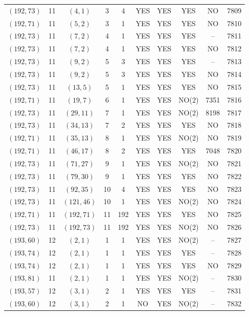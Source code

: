 \begin{longtable}{|c|c|c|c|c|c|c|c|c|c|}
$(192, 73)$ & 11 & $(4, 1)$ & 3 & 4 & YES & YES & YES & NO & 7809\\
$(192, 71)$ & 11 & $(5, 2)$ & 3 & 1 & YES & YES & YES & NO & 7810\\
$(192, 73)$ & 11 & $(7, 2)$ & 4 & 1 & YES & YES & YES & -- & 7811\\
$(192, 73)$ & 11 & $(7, 2)$ & 4 & 1 & YES & YES & YES & NO & 7812\\
$(192, 73)$ & 11 & $(9, 2)$ & 5 & 3 & YES & YES & YES & -- & 7813\\
$(192, 73)$ & 11 & $(9, 2)$ & 5 & 3 & YES & YES & YES & NO & 7814\\
$(192, 73)$ & 11 & $(13, 5)$ & 5 & 1 & YES & YES & YES & NO & 7815\\
$(192, 71)$ & 11 & $(19, 7)$ & 6 & 1 & YES & YES & NO(2) & 7351 & 7816\\
$(192, 73)$ & 11 & $(29, 11)$ & 7 & 1 & YES & YES & NO(2) & 8198 & 7817\\
$(192, 73)$ & 11 & $(34, 13)$ & 7 & 2 & YES & YES & YES & NO & 7818\\
$(192, 71)$ & 11 & $(35, 13)$ & 8 & 1 & YES & YES & NO(2) & NO & 7819\\
$(192, 71)$ & 11 & $(46, 17)$ & 8 & 2 & YES & YES & YES & 7048 & 7820\\
$(192, 73)$ & 11 & $(71, 27)$ & 9 & 1 & YES & YES & NO(2) & NO & 7821\\
$(192, 73)$ & 11 & $(79, 30)$ & 9 & 1 & YES & YES & YES & NO & 7822\\
$(192, 73)$ & 11 & $(92, 35)$ & 10 & 4 & YES & YES & YES & NO & 7823\\
$(192, 73)$ & 11 & $(121, 46)$ & 10 & 1 & YES & YES & NO(2) & NO & 7824\\
$(192, 71)$ & 11 & $(192, 71)$ & 11 & 192 & YES & YES & YES & NO & 7825\\
$(192, 73)$ & 11 & $(192, 73)$ & 11 & 192 & YES & YES & NO(2) & NO & 7826\\
$(193, 60)$ & 12 & $(2, 1)$ & 1 & 1 & YES & YES & NO(2) & -- & 7827\\
$(193, 74)$ & 12 & $(2, 1)$ & 1 & 1 & YES & YES & YES & -- & 7828\\
$(193, 74)$ & 12 & $(2, 1)$ & 1 & 1 & YES & YES & YES & NO & 7829\\
$(193, 81)$ & 11 & $(2, 1)$ & 1 & 1 & YES & YES & NO(2) & -- & 7830\\
$(193, 57)$ & 12 & $(3, 1)$ & 2 & 1 & YES & YES & YES & -- & 7831\\
$(193, 60)$ & 12 & $(3, 1)$ & 2 & 1 & NO & YES & NO(2) & -- & 7832\\

\end{longtable}
